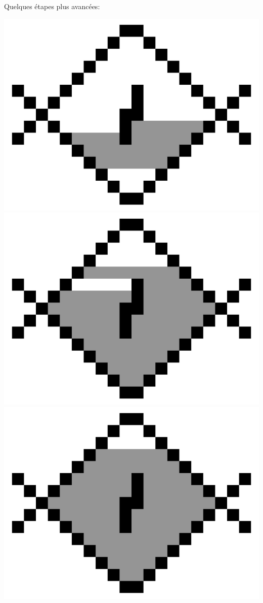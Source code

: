 \documentclass[11pt,class=report,crop=false]{standalone}
\begin{document}
Quelques étapes plus avancées:	
\begin{center}
	\includegraphics[scale=\myscale,scale=0.20]{figures/fill02_012}\quad
	\includegraphics[scale=\myscale,scale=0.20]{figures/fill02_054}\quad
	\includegraphics[scale=\myscale,scale=0.20]{figures/fill02_065}\quad

\end{center}
\end{document}
